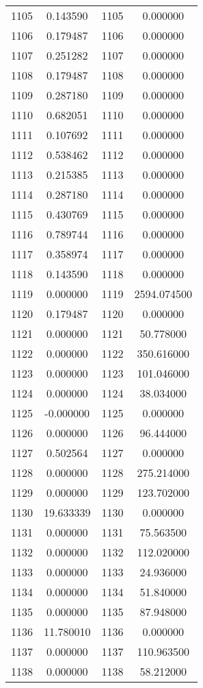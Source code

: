 \documentclass[12pt]{article}
\begin{document}
\begin{longtable}{@{}cccc@{}}
1105 & 0.143590 & 1105 & 0.000000 \\
1106 & 0.179487 & 1106 & 0.000000 \\
1107 & 0.251282 & 1107 & 0.000000 \\
1108 & 0.179487 & 1108 & 0.000000 \\
1109 & 0.287180 & 1109 & 0.000000 \\
1110 & 0.682051 & 1110 & 0.000000 \\
1111 & 0.107692 & 1111 & 0.000000 \\
1112 & 0.538462 & 1112 & 0.000000 \\
1113 & 0.215385 & 1113 & 0.000000 \\
1114 & 0.287180 & 1114 & 0.000000 \\
1115 & 0.430769 & 1115 & 0.000000 \\
1116 & 0.789744 & 1116 & 0.000000 \\
1117 & 0.358974 & 1117 & 0.000000 \\
1118 & 0.143590 & 1118 & 0.000000 \\
1119 & 0.000000 & 1119 & 2594.074500 \\
1120 & 0.179487 & 1120 & 0.000000 \\
1121 & 0.000000 & 1121 & 50.778000 \\
1122 & 0.000000 & 1122 & 350.616000 \\
1123 & 0.000000 & 1123 & 101.046000 \\
1124 & 0.000000 & 1124 & 38.034000 \\
1125 & -0.000000 & 1125 & 0.000000 \\
1126 & 0.000000 & 1126 & 96.444000 \\
1127 & 0.502564 & 1127 & 0.000000 \\
1128 & 0.000000 & 1128 & 275.214000 \\
1129 & 0.000000 & 1129 & 123.702000 \\
1130 & 19.633339 & 1130 & 0.000000 \\
1131 & 0.000000 & 1131 & 75.563500 \\
1132 & 0.000000 & 1132 & 112.020000 \\
1133 & 0.000000 & 1133 & 24.936000 \\
1134 & 0.000000 & 1134 & 51.840000 \\
1135 & 0.000000 & 1135 & 87.948000 \\
1136 & 11.780010 & 1136 & 0.000000 \\
1137 & 0.000000 & 1137 & 110.963500 \\
1138 & 0.000000 & 1138 & 58.212000 \\

\end{longtable}
\end{document}
